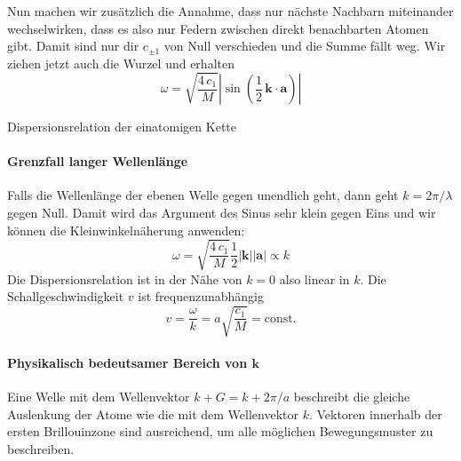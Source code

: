 Nun machen wir zusätzlich die Annahme, dass nur nächste Nachbarn miteinander wechselwirken, dass es also nur Federn zwischen direkt benachbarten Atomen gibt. Damit sind nur dir $c_{\pm 1}$ von Null verschieden und die Summe fällt weg. Wir ziehen jetzt auch die Wurzel und erhalten
\begin{equation}
\omega = \sqrt{\frac{4 \, c_1}{M}} \left| \sin (\frac{1}{2} \, \mathbf{k} \cdot \mathbf{a}  ) \right|
\end{equation}

\begin{marginfigure}

\caption{Dispersionsrelation der einatomigen Kette}
\end{marginfigure}


\paragraph{Grenzfall langer Wellenlänge} Falls die Wellenlänge der ebenen Welle gegen unendlich geht, dann geht $k = 2 \pi / \lambda$  gegen Null. Damit wird das Argument des Sinus sehr klein gegen Eins und wir können die Kleinwinkelnäherung anwenden:
\begin{equation}
\omega = \sqrt{\frac{4 \, c_1}{M}} \frac{1}{2}  |\mathbf{k}| | \mathbf{a}| \propto k
\end{equation}
Die Dispersionsrelation ist in der Nähe von $k = 0$ also linear in $k$. Die Schallgeschwindigkeit $v$ ist frequenzunabhängig
\begin{equation}
 v = \frac{\omega}{k} = a  \sqrt{\frac{ c_1}{M}}  = \text{const.}
\end{equation}



\paragraph{Physikalisch bedeutsamer Bereich von $\mathbf{k}$} 

\begin{marginfigure}

\caption{Eine Welle mit dem Wellenvektor $k + G = k + 2\pi /a$ beschreibt die gleiche Auslenkung der Atome wie die mit dem Wellenvektor $k$.  Vektoren innerhalb der ersten Brillouinzone sind ausreichend, um alle möglichen Bewegungsmuster zu beschreiben. \label{fig:phonon_k_plus_g} }
\end{marginfigure}



